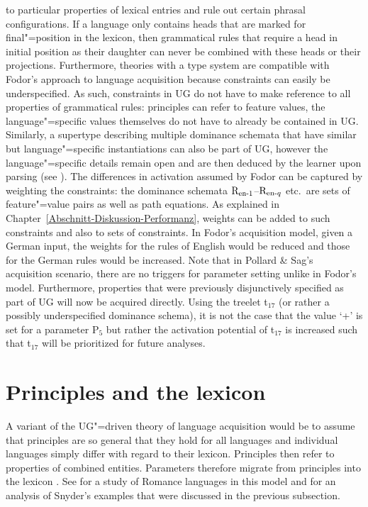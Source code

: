 to particular properties of lexical entries and rule out certain phrasal configurations.
If a language only contains heads that are marked for final"=position in the lexicon, then grammatical rules that
require a head in initial position as their daughter can never be combined with these heads or their projections.
Furthermore, theories with a type system are compatible with Fodor's approach to language acquisition because 
constraints can easily be underspecified. As such, constraints in UG do not have to make reference to all properties
of grammatical rules: principles can refer to feature values, the language"=specific values themselves do not have to
already be contained in UG. Similarly, a supertype describing multiple dominance schemata that have
similar but language"=specific instantiations can also be part of UG, however the language"=specific details remain open and are then deduced by the learner
upon parsing (see \citealp[Section~9.2]{AW98a}). The differences in activation assumed by Fodor can be captured
by weighting the constraints: the dominance schemata $\text{R}_{\text{en}\text{\normalfont -}1}$--$\text{R}_{\text{en}\text{\normalfont -} q}$ etc.\ are sets of
feature"=value pairs as well as path equations. As explained in Chapter~\ref{Abschnitt-Diskussion-Performanz}, 
weights can be added to such constraints and also to sets of constraints. In Fodor's acquisition model, given a German input, the weights for the rules
of English would be reduced and those for the German rules would be increased. Note that in Pollard
\& Sag's acquisition scenario, there are no triggers for parameter
setting unlike in Fodor's model.
Furthermore, properties that were previously disjunctively specified as part of UG will now be
acquired directly. Using the treelet t$_{17}$ (or rather a possibly underspecified dominance
schema), it is not the case that the value `+' is set for a parameter P$_5$  but rather the activation
potential of t$_{17}$ is increased such that t$_{17}$ will be prioritized for future
analyses.


\section{Principles and the lexicon}

A variant of the UG"=driven theory of language acquisition would be to assume that principles are so general that they hold
for all languages and individual languages simply differ with regard to their lexicon.
Principles then refer to properties of combined entities. Parameters therefore migrate from principles into the lexicon
\citep[]{Chomsky99a}. See \citet{MR2010a} for a study of Romance languages in this model and
\citet[]{SonS2008a} for an analysis of Snyder's examples that were discussed in the
previous subsection.


